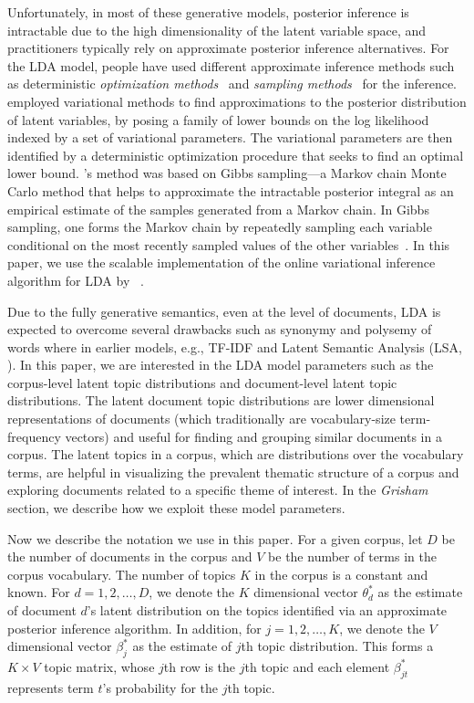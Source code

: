 \documentclass[letterpaper]{article}
\newcommand{\system}{\textsl{Grisham}\xspace}
\begin{document}
Unfortunately, in most of these generative models, posterior 
inference is intractable due to the high dimensionality of the 
latent variable space, and practitioners typically rely on 
approximate posterior inference alternatives. For the LDA model, 
people have used different approximate inference methods such as 
deterministic \textsl{optimization methods}~\cite{Blei2003} and 
\textsl{sampling methods}~\cite{Griffiths2004} for the inference. 
\citeauthor{Blei2003} employed variational methods to find 
approximations to the posterior distribution of latent variables, by 
posing a family of lower bounds on the log likelihood indexed 
by a set of variational parameters. The variational parameters are 
then identified by a deterministic optimization procedure that seeks 
to find an optimal lower bound. \citeauthor{Griffiths2004}'s method 
was based on Gibbs sampling---a Markov chain Monte Carlo 
method that helps to approximate the intractable posterior integral 
as an empirical estimate of the samples generated from a Markov chain.   
In Gibbs sampling, one forms the Markov chain by repeatedly sampling 
each variable conditional on the most recently sampled values of the 
other variables~\cite{Geman1984}. In this paper, we use the scalable 
implementation of the online variational inference algorithm for LDA
\cite{hoffman2010online} by~\citeauthor{rehurek_lrec} 
\citeyear{rehurek_lrec}. 


Due to the fully generative semantics, even at the level of 
documents, LDA is expected to overcome several drawbacks such as 
synonymy and polysemy of words where in earlier models, e.g., TF-IDF
\cite{Salton1975} and Latent Semantic Analysis (LSA, \citeauthor{Dumais1995} 
\citeyear{Dumais1995}). In this paper, we are interested in the LDA 
model parameters such as the corpus-level latent topic distributions 
and document-level latent topic distributions. The latent document 
topic distributions are lower dimensional representations of 
documents (which traditionally are vocabulary-size term-frequency vectors) 
and useful for finding and grouping similar documents in a corpus. 
The latent topics in a corpus, which are distributions over the 
vocabulary terms, are helpful in visualizing the prevalent thematic 
structure of a corpus and exploring documents related to a specific 
theme of interest. In the \system section, we describe how we 
exploit these model parameters.   

Now we describe the notation we use in this paper. For a given corpus, 
let $D$ be the number of documents in the corpus and $V$ be the 
number of terms in the corpus vocabulary. The number of topics $K$ 
in the corpus is a constant and known. For $d = 1, 2, \ldots, D$, we 
denote the $K$ dimensional vector $\theta_d^{*}$ as the estimate of 
document $d$'s latent distribution on the topics identified via an 
approximate posterior inference algorithm. In addition, for $j = 1, 
2, \ldots, K$, we denote the $V$ dimensional vector $\beta_j^{*}$ as 
the estimate of $j$th topic distribution. This forms a $K \times V$ 
topic matrix, whose $j$th row is the $j$th topic and each element 
$\beta_{jt}^{*}$ represents term $t$'s probability for the 
$j$th topic.   
\end{document}
